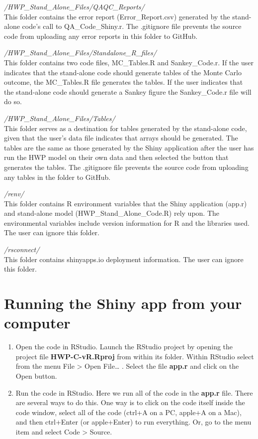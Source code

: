 \documentclass[
  openany]{book}
\begin{document}
\emph{/HWP\_Stand\_Alone\_Files/QAQC\_Reports/}\\
This folder contains the error report (Error\_Report.csv) generated by the stand-alone code's call to QA\_Code\_Shiny.r. The .gitignore file prevents the source code from uploading any error reports in this folder to GitHub.

\emph{/HWP\_Stand\_Alone\_Files/Standalone\_R\_files/}\\
This folder contains two code files, MC\_Tables.R and Sankey\_Code.r. If the user indicates that the stand-alone code should generate tables of the Monte Carlo outcome, the MC\_Tables.R file generates the tables. If the user indicates that the stand-alone code should generate a Sankey figure the Sankey\_Code.r file will do so.

\emph{/HWP\_Stand\_Alone\_Files/Tables/}\\
This folder serves as a destination for tables generated by the stand-alone code, given that the user's data file indicates that arrays should be generated. The tables are the same as those generated by the Shiny application after the user has run the HWP model on their own data and then selected the button that generates the tables. The .gitignore file prevents the source code from uploading any tables in the folder to GitHub.

\emph{/renv/}\\
This folder contains R environment variables that the Shiny application (app.r) and stand-alone model (HWP\_Stand\_Alone\_Code.R) rely upon. The environmental variables include version information for R and the libraries used. The user can ignore this folder.

\emph{/rsconnect/}\\
This folder contains shinyapps.io deployment information. The user can ignore this folder.

\hypertarget{dnld-shiny}{%
\section{Running the Shiny app from your computer}\label{dnld-shiny}}

\begin{enumerate}
\def\labelenumi{\arabic{enumi}.}
\item
  Open the code in RStudio. Launch the RStudio project by opening the project file \textbf{HWP-C-vR.Rproj} from within its folder. Within RStudio select from the menu File \textgreater{} Open File\ldots{} . Select the file \textbf{app.r} and click on the Open button.
\item
  Run the code in RStudio. Here we run all of the code in the \textbf{app.r} file. There are several ways to do this. One way is to click on the code itself inside the code window, select all of the code (ctrl+A on a PC, apple+A on a Mac), and then ctrl+Enter (or apple+Enter) to run everything. Or, go to the menu item and select Code \textgreater{} Source.
\end{enumerate}
\end{document}
